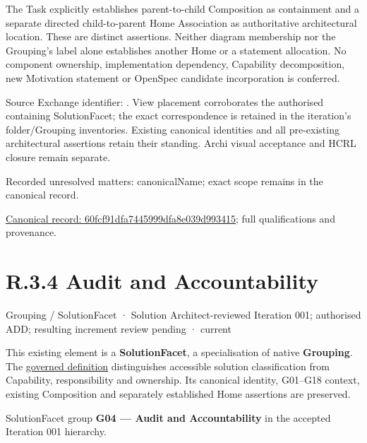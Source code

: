 The Task explicitly establishes parent-to-child Composition as containment and
a separate directed child-to-parent Home Association as authoritative architectural
location. These are distinct assertions. Neither diagram membership nor the
Grouping's label alone establishes another Home or a statement allocation.
No component ownership, implementation dependency, Capability decomposition,
new Motivation statement or OpenSpec candidate incorporation is conferred.



Source Exchange identifier: \texttt{}. View placement corroborates
the authorised containing SolutionFacet; the exact correspondence is retained in the
iteration's folder/Grouping inventories. Existing canonical identities and all
pre-existing architectural assertions retain their standing. Archi visual
acceptance and HCRL closure remain separate.


{\small Recorded unresolved matters: canonicalName; exact scope remains in the canonical record.}\par
{\footnotesize \href{../../../../../../../continuum/grouping/60fcf91dfa7445999dfa8e039d993415.md}{Canonical record: 60fcf91dfa7445999dfa8e039d993415}; full qualifications and provenance.}\par
\section*{R.3.4 Audit and Accountability}
\label{navigation:R.3.4}

\label{element:abc27ddff6d644d9945db0cfd7488f07}
{\small Grouping / SolutionFacet · Solution Architect-reviewed Iteration 001; authorised ADD; resulting increment review pending · current}\par

This existing element is a \textbf{SolutionFacet}, a specialisation of native
\textbf{Grouping}. The \href{\detokenize{../../../../../../../governance/continuum-representation.md#solutionfacet-classification--1119-candidate}}{governed definition}
distinguishes accessible solution classification from Capability, responsibility
and ownership. Its canonical identity, G01–G18 context, existing Composition
and separately established Home assertions are preserved.



SolutionFacet group \textbf{G04 — Audit and Accountability} in the accepted Iteration 001 hierarchy.



